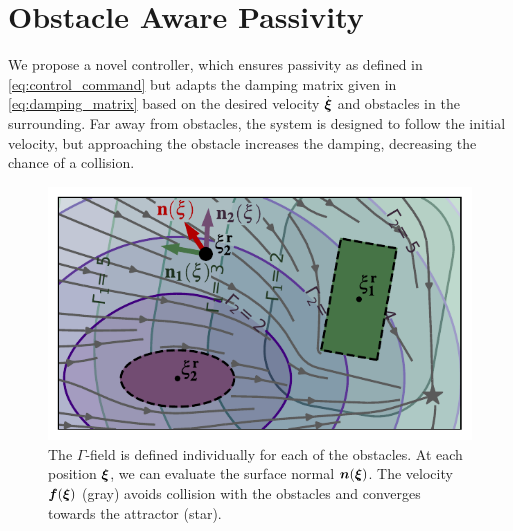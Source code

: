\section{Obstacle Aware Passivity} \label{sec:obstacle_aware_passivity}
We propose a novel controller, which ensures passivity as defined in \eqref{eq:control_command} but adapts the damping matrix given in \eqref{eq:damping_matrix} based on the desired velocity $\dot{\boldsymbol{\xi}}$ and obstacles in the surrounding. 
Far away from obstacles, the system is designed to follow the initial velocity, but approaching the obstacle increases the damping, decreasing the chance of a collision.

\ifthesis
\begin{figure}
\centerline{\includegraphics[width=0.7\columnwidth]{figures/normal_and_gamma_field_visualization_annotated.pdf}}
\caption{
The $\Gamma$-field is defined individually for each of the obstacles. At each position $\boldsymbol{\xi}$, we can evaluate the surface normal $\boldsymbol{n}(\boldsymbol{\xi})$. 
The velocity $\boldsymbol{f}(\boldsymbol{\xi})$ (gray) avoids collision with the obstacles and converges towards the attractor (star).}
\label{fig:resultant_normal}
\end{figure}
\fi


